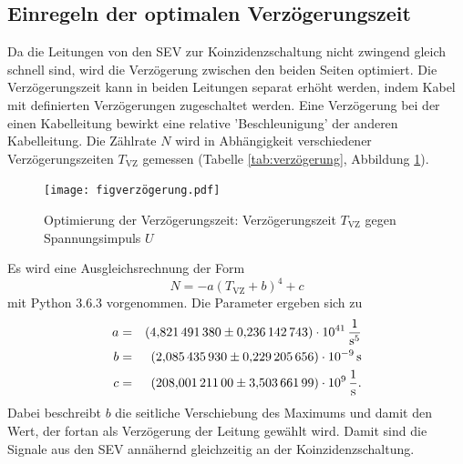 \subsection{Einregeln der optimalen Verzögerungszeit}
Da die Leitungen von den SEV zur Koinzidenzschaltung nicht zwingend gleich schnell sind, wird die Verzögerung zwischen den beiden Seiten optimiert.
Die Verzögerungszeit kann in beiden Leitungen separat erhöht werden, indem Kabel mit definierten Verzögerungen zugeschaltet werden.
Eine Verzögerung bei der einen Kabelleitung bewirkt eine relative 'Beschleunigung' der anderen Kabelleitung.
Die Zählrate $N$ wird in Abhängigkeit verschiedener Verzögerungszeiten $T_{\text{VZ}}$ gemessen (Tabelle \ref{tab:verzögerung}, Abbildung \ref{fig:verzögerung}).

\begin{figure}[h!]
  \centering
  \texttt{[image: figverzögerung.pdf]}
  \caption{Optimierung der Verzögerungszeit: Verzögerungszeit $T_{\text{VZ}}$ gegen Spannungsimpuls $U$}
  \label{fig:verzögerung}
\end{figure}
Es wird eine Ausgleichsrechnung der Form
\begin{equation*}
  N = -a \left( T_{\text{VZ}} +b \right)^4+c
\end{equation*}
mit Python 3.6.3 vorgenommen.
Die Parameter ergeben sich zu
\begin{align*}
  a &=& \SI{4.82149138 \pm 0.236142743 e41}{\frac{1}{s^5}}\\
  b &=& \SI{2.08543593 \pm 0.229205656 e-9}{s}\\
  c &=& \SI{208.001211 \pm 3.50366199 e9}{\frac{1}{s}}.\\
\end{align*}
Dabei beschreibt $b$ die seitliche Verschiebung des Maximums und damit den Wert, der fortan als Verzögerung der Leitung gewählt wird.
Damit sind die Signale aus den SEV annähernd gleichzeitig an der Koinzidenzschaltung.
\FloatBarrier

